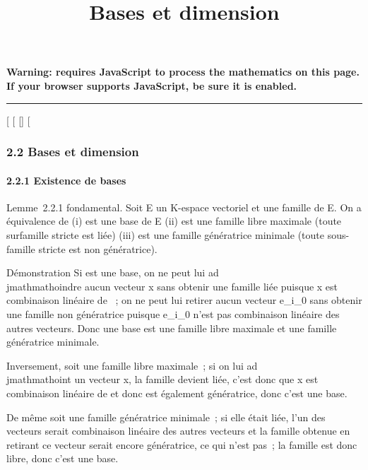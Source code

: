 \documentclass[]{article}
\title{Bases et dimension}
\author{}
\date{}
\begin{document}
\maketitle

\textbf{Warning: 
requires JavaScript to process the mathematics on this page.\\ If your
browser supports JavaScript, be sure it is enabled.}

\begin{center}\rule{3in}{0.4pt}\end{center}

{[}
{[}
{[}{]}
{[}

\subsubsection{2.2 Bases et dimension}

\paragraph{2.2.1 Existence de bases}

Lemme~2.2.1 fondamental. Soit E un K-espace vectoriel et  une famille
de E. On a équivalence de (i)  est une base de E (ii)  est une famille
libre maximale (toute surfamille stricte est liée) (iii)  est une
famille génératrice minimale (toute sous-famille stricte est non
génératrice).

Démonstration Si  est une base, on ne peut lui ad\\jmathmathoindre aucun vecteur
x sans obtenir une famille liée puisque x est combinaison linéaire de
~; on ne peut lui retirer aucun vecteur e_i_0 sans
obtenir une famille non génératrice puisque e_i_0
n'est pas combinaison linéaire des autres vecteurs. Donc une base est
une famille libre maximale et une famille génératrice minimale.

Inversement, soit  une famille libre maximale~; si on lui ad\\jmathmathoint un
vecteur x, la famille devient liée, c'est donc que x est combinaison
linéaire de  et donc  est également génératrice, donc c'est une base.

De même soit  une famille génératrice minimale~; si elle était liée,
l'un des vecteurs serait combinaison linéaire des autres vecteurs et la
famille obtenue en retirant ce vecteur serait encore génératrice, ce qui
n'est pas~; la famille est donc libre, donc c'est une base.
\end{document}
